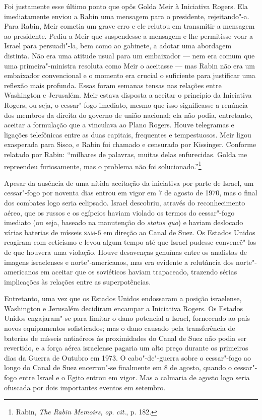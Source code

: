 Foi justamente esse último ponto que opôs Golda Meir à Iniciativa
Rogers. Ela imediatamente enviou a Rabin uma mensagem para o presidente,
rejeitando"-a. Para Rabin, Meir cometia um grave erro e ele relutou em
transmitir a mensagem ao presidente. Pediu a Meir que suspendesse a
mensagem e lhe permitisse voar a Israel para persuadi"-la, bem como ao gabinete,
a adotar uma abordagem distinta. Não era uma atitude usual para um
embaixador --- nem era comum que uma primeira"-ministra resoluta como Meir
o aceitasse --- mas Rabin não era um embaixador convencional e o momento
era crucial o suficiente para justificar uma reflexão mais profunda.
Essas foram semanas tensas nas relações entre Washington e Jerusalém.
Meir estava disposta a aceitar o princípio da Iniciativa Rogers, ou
seja, o cessar"-fogo imediato, mesmo que isso significasse a renúncia dos
membros da direita do governo de união nacional; ela não podia,
entretanto, aceitar a formulação que a vinculava ao Plano Rogers. Houve
telegramas e ligações telefônicas entre as duas capitais, frequentes e
tempestuosos. Meir ligou exasperada para Sisco, e Rabin foi chamado e
censurado por Kissinger. Conforme relatado por Rabin: ``milhares de
palavras, muitas delas enfurecidas. Golda me repreendeu furiosamente,
mas o problema não foi solucionado.''\footnote{Rabin, \emph{The Rabin Memoirs}, \emph{op}. \emph{cit}., p. 182.}

Apesar da ausência de uma nítida aceitação da iniciativa por parte de
Israel, um cessar"-fogo por noventa dias entrou em vigor em 7 de agosto
de 1970, mas o final dos combates logo seria eclipsado. Israel descobriu,
através do reconhecimento aéreo, que os russos e os egípcios haviam
violado os termos do cessar"-fogo imediato (ou seja, baseado na
manutenção do \emph{status quo}) e haviam deslocado várias baterias de
mísseis \textsc{sam}-6 em direção ao Canal de Suez. Os Estados Unidos reagiram
com ceticismo e levou algum tempo até que Israel pudesse convencê"-los de
que houvera uma violação. Houve desavenças genuínas entre os analistas
de imagens israelenses e norte"-americanos, mas era evidente a relutância
dos norte"-americanos em aceitar que os soviéticos haviam trapaceado,
trazendo sérias implicações às relações entre as superpotências.

Entretanto, uma vez que os Estados Unidos endossaram a posição
israelense, Washington e Jerusalém decidiram encampar a Iniciativa
Rogers. Os Estados Unidos engajaram"-se para limitar o dano potencial a
Israel, fornecendo ao país novos equipamentos sofisticados; mas o dano
causado pela transferência de baterias de mísseis antiaéreos às
proximidades do Canal de Suez não podia ser revertido, e a força aérea
israelense pagaria um alto preço durante os primeiros dias da Guerra de
Outubro em 1973. O cabo"-de"-guerra sobre o cessar"-fogo ao longo do Canal
de Suez encerrou"-se finalmente em 8 de agosto, quando o cessar"-fogo
entre Israel e o Egito entrou em vigor. Mas a calmaria de agosto logo
seria ofuscada por dois importantes eventos em setembro.

